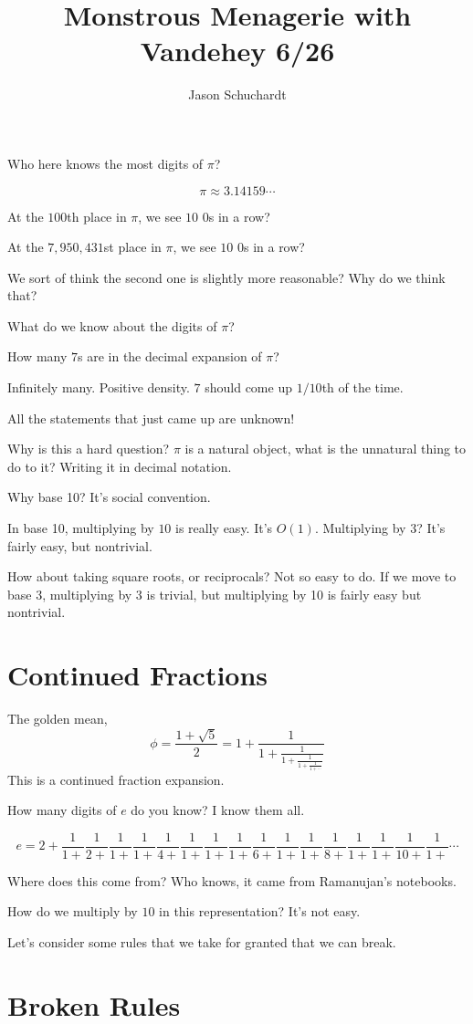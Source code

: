 \documentclass{article}
\title{Monstrous Menagerie with Vandehey 6/26}
\author{Jason Schuchardt}
\newcommand\cft[1]{\frac{1}{#1+}}
\begin{document}
Who here knows the most digits of $\pi$?

\[ \pi \approx 3.14159\cdots \]

At the $100$th place in $\pi$, we see $10$ $0$s in a row?

At the $7,950,431$st place in $\pi$, we see $10$ $0$s in a row?

We sort of think the second one is slightly more reasonable? Why do we think that?

What do we know about the digits of $\pi$?

How many $7$s are in the decimal expansion of $\pi$?

Infinitely many. Positive density.
$7$ should come up $1/10$th of the time.

All the statements that just came up are unknown!

Why is this a hard question? $\pi$ is a natural object, what is the unnatural thing to do to it?
Writing it in decimal notation.

Why base 10? It's social convention.

In base 10, multiplying by $10$ is really easy. It's $O(1)$. Multiplying by $3$? It's fairly easy,
but nontrivial.

How about taking square roots, or reciprocals? Not so easy to do.
If we move to base 3, multiplying by 3 is trivial, but multiplying by 10 is fairly easy
but nontrivial.

\section{Continued Fractions}

The golden mean, 
\[ \phi = \frac{1+\sqrt{5}}{2} =  1+\frac{1}{1+\frac{1}{1+\frac{1}{1+\frac{1}{1+\cdots}}}} \]
This is a continued fraction expansion.

How many digits of $e$ do you know? I know them all. 

\[e=2+\frac{1}{1+}
\frac{1}{2+}\frac{1}{1+}\frac{1}{1+}\frac{1}{4+}\frac{1}{1+}\frac{1}{1+}\frac{1}{1+}\frac{1}{6+}
\cft{1}\cft{1}\cft{8}\cft{1}\cft{1}\cft{10}\cft{1}\cdots
\]

Where does this come from? Who knows, it came from Ramanujan's notebooks.

How do we multiply by $10$ in this representation? It's not easy.

Let's consider some rules that we take for granted that we can break.

\section{Broken Rules}
\end{document}
